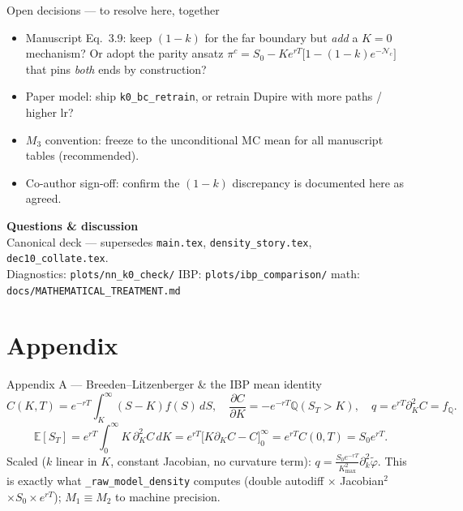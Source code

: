 \documentclass[aspectratio=169,11pt]{beamer}
\newcommand{\gold}[1]{{\color{ntugold}#1}}
\begin{document}
\begin{frame}{Open decisions --- to resolve here, together}
  \begin{itemize}
    \item \gold{Manuscript Eq.~3.9:} keep $(1-k)$ for the far boundary but \emph{add} a $K=0$ mechanism?
          Or adopt the parity ansatz
          $\pi^c=S_0-Ke^{rT}\bigl[1-(1-k)e^{-\mathcal{N}_c}\bigr]$ that pins \emph{both} ends by construction?
    \item \gold{Paper model:} ship \texttt{k0\_bc\_retrain}, or retrain Dupire with more paths / higher lr?
    \item \gold{$M_3$ convention:} freeze to the unconditional MC mean for all manuscript tables (recommended).
    \item \gold{Co-author sign-off:} confirm the $(1-k)$ discrepancy is documented here as agreed.
  \end{itemize}
\end{frame}

\begin{frame}{}
  \begin{center}
    \vspace{1.6cm}
    {\Huge\bfseries\color{white} Questions \& discussion}\\[0.6em]
    {\normalsize\color{ntugold}
      Canonical deck --- supersedes \texttt{main.tex}, \texttt{density\_story.tex}, \texttt{dec10\_collate.tex}.}\\[0.3em]
    {\footnotesize\color{white}
      Diagnostics: \texttt{plots/nn\_k0\_check/} \;\textbar\; IBP: \texttt{plots/ibp\_comparison/}
      \;\textbar\; math: \texttt{docs/MATHEMATICAL\_TREATMENT.md}}
  \end{center}
\end{frame}

\appendix
\section{Appendix}

\begin{frame}{Appendix A --- Breeden--Litzenberger \& the IBP mean identity}
  \small
  \[
    C(K,T)=e^{-rT}\!\int_K^\infty(S-K)f(S)\,dS,\quad
    \frac{\partial C}{\partial K}=-e^{-rT}\mathbb{Q}(S_T{>}K),\quad
    \boxed{q=e^{rT}\partial_K^2C=f_{\mathbb{Q}}}.
  \]
  \[
    \mathbb{E}[S_T]=e^{rT}\!\int_0^\infty K\,\partial_K^2C\,dK
      =e^{rT}\bigl[K\partial_KC-C\bigr]_0^\infty=e^{rT}C(0,T)=\boxed{S_0e^{rT}}.
  \]
  Scaled ($k$ linear in $K$, constant Jacobian, no curvature term):
  $q=\tfrac{S_0e^{-rT}}{K_{\max}^2}\partial_k^2\tilde\varphi$. This is exactly what
  \texttt{\_raw\_model\_density} computes (double autodiff $\times$ Jacobian$^2$ $\times S_0 \times e^{rT}$);
  $M_1\equiv M_2$ to machine precision.
\end{frame}
\end{document}
